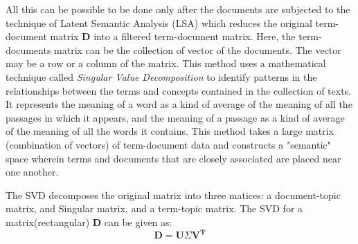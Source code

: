 \documentclass[12pt]{report}
\begin{document}
        All this can be possible to be done only after the documents are subjected to the technique of Latent Semantic Analysis (LSA)\cite{deerwester1990indexing} 
        which reduces the
        original term-document matrix \textbf{D} into a filtered term-document matrix. Here, the term-documents matrix can be the collection of vector of the documents. 
        The vector may be a row or a column of the matrix. 
        This method uses a mathematical technique called \emph{Singular Value Decomposition} to identify patterns in the relationships between the terms and 
        concepts contained in the collection of texts. It represents the meaning of a word as a kind of average of the meaning of all the passages in which it appears, 
        and the meaning of a passage as a kind of average of the meaning of all the words it contains\cite{landauer1998introduction}. 
        This method takes a large matrix (combination of vectors) of term-document data and constructs a "semantic" space wherein terms and documents that are closely associated 
        are placed near one another. 
        
        The SVD decomposes the original matrix into three matices: a document-topic matrix, and Singular matrix, and a term-topic matrix. 
        The SVD for a matrix(rectangular) \textbf{D} can be given as:
        \begin{equation}\label{eq1}
            \mathbf{D} = \mathbf{U} \Sigma  \mathbf{V^T}
        \end{equation}
        
\end{document}
